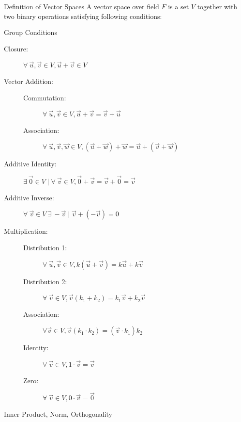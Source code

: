 \documentclass{beamer}
\begin{document}
\begin{frame}{Definition of Vector Spaces}
    A vector space over field $F$ is a set $V$ together with two binary operations satisfying following conditions:
    \begin{block}{Group Conditions}
        {\tiny
            \begin{description}
                \item [Closure: ] $\forall\ \vec{u}, \vec{v} \in V, \vec{u} + \vec{v} \in V$
                \item [Vector Addition:]\hfill
                \begin{description}
                    \item [Commutation: ] $\forall\ \vec{u}, \vec{v} \in V, \vec{u}+\vec{v}=\vec{v}+\vec{u}$
                    \item [Association: ] $\forall\ \vec{u}, \vec{v}, \vec{w} \in V, (\vec{u} + \vec{w}) + \vec{w} = \vec{u} + (\vec{v} + \vec{w})$
                \end{description}
                \item [Additive Identity: ] $\exists\ \vec{0} \in V \mid \forall\ \vec{v} \in V, \vec{0} + \vec{v} = \vec{v} + \vec{0} = \vec{v}$
                \item [Additive Inverse: ] $\forall\ \vec{v} \in V\ \exists\ -\vec{v} \mid \vec{v}+(-\vec{v}) =0$
                \item [Multiplication: ]\hfill
                \begin{description}
                    \item [Distribution 1: ] $\forall\ \vec{u}, \vec{v} \in V, k(\vec{u}+\vec{v}) = k\vec{u}+k\vec{v}$
                    \item [Distribution 2: ] $\forall\ \vec{v} \in V, \vec{v}(k_1+k_2)=k_1\vec{v}+k_2\vec{v}$
                    \item [Association: ] $\forall \vec{v} \in V, \vec{v}(k_1\cdot k_2)=(\vec{v}\cdot k_1)k_2$
                    \item [Identity: ] $\forall\ \vec{v} \in V, 1\cdot \vec{v}=\vec{v}$
                    \item [Zero: ] $\forall\ \vec{v} \in V, 0\cdot\vec{v} = \vec{0}$
                \end{description}
            \end{description}
        }
    \end{block}
\end{frame}

\begin{frame}{Inner Product, Norm, Orthogonality}
\end{frame}
\end{document}
